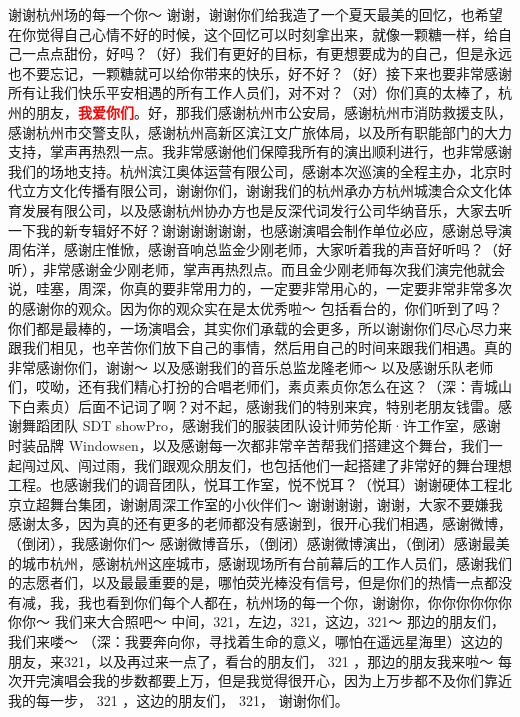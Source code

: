 \documentclass[
]{book}
\begin{document}
谢谢杭州场的每一个你～ 谢谢，谢谢你们给我造了一个夏天最美的回忆，也希望在你觉得自己心情不好的时候，这个回忆可以时刻拿出来，就像一颗糖一样，给自己一点点甜份，好吗？（好）我们有更好的目标，有更想要成为的自己，但是永远也不要忘记，一颗糖就可以给你带来的快乐，好不好？（好）接下来也要非常感谢所有让我们快乐平安相遇的所有工作人员们，对不对？（对）你们真的太棒了，杭州的朋友，\textbf{\textcolor{red}{我爱你们}}。好，那我们感谢杭州市公安局，感谢杭州市消防救援支队，感谢杭州市交警支队，感谢杭州高新区滨江文广旅体局，以及所有职能部门的大力支持，掌声再热烈一点。我非常感谢他们保障我所有的演出顺利进行，也非常感谢我们的场地支持。杭州滨江奥体运营有限公司，感谢本次巡演的全程主办，北京时代立方文化传播有限公司，谢谢你们，谢谢我们的杭州承办方杭州城澳合众文化体育发展有限公司，以及感谢杭州协办方也是反深代词发行公司华纳音乐，大家去听一下我的新专辑好不好？谢谢谢谢谢谢，也感谢演唱会制作单位必应，感谢总导演周佑洋，感谢庄惟惞，感谢音响总监金少刚老师，大家听着我的声音好听吗？（好听），非常感谢金少刚老师，掌声再热烈点。而且金少刚老师每次我们演完他就会说，哇塞，周深，你真的要非常用力的，一定要非常用心的，一定要非常非常多次的感谢你的观众。因为你的观众实在是太优秀啦～ 包括看台的，你们听到了吗？你们都是最棒的，一场演唱会，其实你们承载的会更多，所以谢谢你们尽心尽力来跟我们相见，也辛苦你们放下自己的事情，然后用自己的时间来跟我们相遇。真的非常感谢你们，谢谢～ 以及感谢我们的音乐总监龙隆老师～ 以及感谢乐队老师们，哎呦，还有我们精心打扮的合唱老师们，素贞素贞你怎么在这？（深：青城山下白素贞）后面不记词了啊？对不起，感谢我们的特别来宾，特别老朋友钱雷。感谢舞蹈团队 SDT showPro，感谢我们的服装团队设计师劳伦斯·许工作室，感谢时装品牌 Windowsen，以及感谢每一次都非常辛苦帮我们搭建这个舞台，我们一起闯过风、闯过雨，我们跟观众朋友们，也包括他们一起搭建了非常好的舞台理想工程。也感谢我们的调音团队，悦耳工作室，悦不悦耳？（悦耳）谢谢硬体工程北京立超舞台集团，谢谢周深工作室的小伙伴们～ 谢谢谢谢，谢谢，大家不要嫌我感谢太多，因为真的还有更多的老师都没有感谢到，很开心我们相遇，感谢微博，（倒闭），我感谢你们～ 感谢微博音乐，（倒闭）感谢微博演出，（倒闭）感谢最美的城市杭州，感谢杭州这座城市，感谢现场所有台前幕后的工作人员们，感谢我们的志愿者们，以及最最重要的是，哪怕荧光棒没有信号，但是你们的热情一点都没有减，我，我也看到你们每个人都在，杭州场的每一个你，谢谢你，你你你你你你你你～ 我们来大合照吧～ 中间，321，左边，321，这边，321～ 那边的朋友们，我们来喽～ （深：我要奔向你，寻找着生命的意义，哪怕在遥远星海里）这边的朋友，来321，以及再过来一点了，看台的朋友们， 321 ，那边的朋友我来啦～ 每次开完演唱会我的步数都要上万，但是我觉得很开心，因为上万步都不及你们靠近我的每一步， 321 ，这边的朋友们， 321， 谢谢你们。
\end{document}
